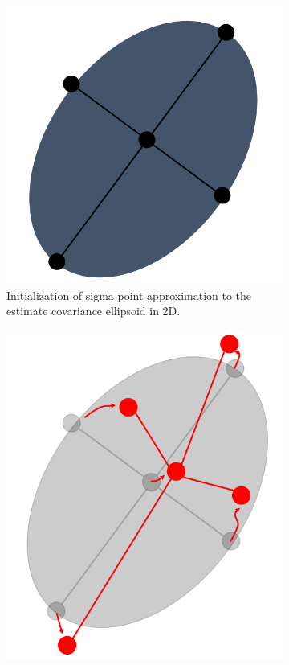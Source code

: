 \begin{figure}[h!]
	\centering
	\begin{subfigure}[l]{0.35\textwidth}
	\includegraphics[width=\linewidth]{./ukf1}
	\caption{Initialization of sigma point approximation to the estimate covariance ellipsoid in 2D.}
	\label{fig:ukf1}
	\end{subfigure}
	\hspace{0.04\textwidth}
	\begin{subfigure}[r]{0.35\textwidth}
	\includegraphics[width=\linewidth]{./ukf2}

\end{subfigure}
\end{figure}
